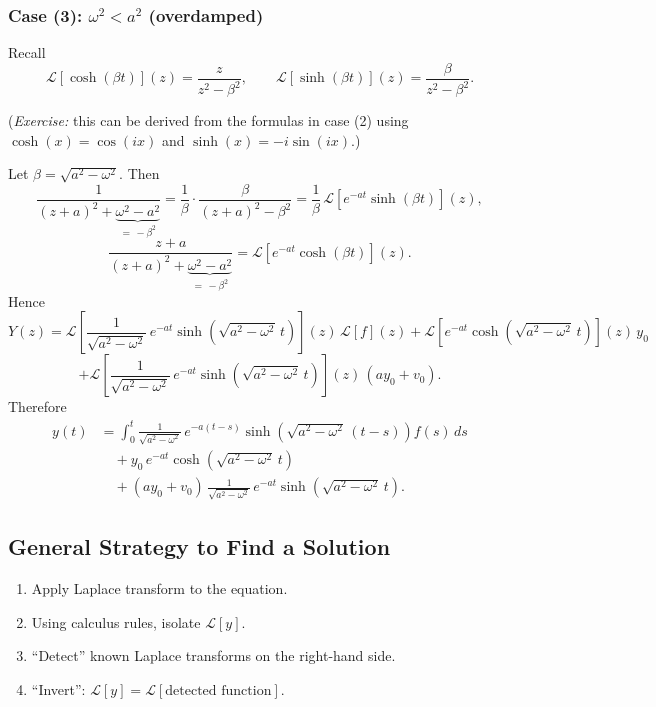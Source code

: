\subsubsection*{Case (3): $\omega^2 < a^2$ (overdamped)}

Recall
\[
\boxed{\mathcal{L}[\cosh(\beta t)](z) = \frac{z}{z^2 - \beta^2}, \qquad
\mathcal{L}[\sinh(\beta t)](z) = \frac{\beta}{z^2 - \beta^2}.}
\]

(\textit{Exercise:} this can be derived from the formulas in case (2) using $\cosh(x) = \cos(ix)$ and $\sinh(x) = -i\sin(ix)$.)

Let $\beta = \sqrt{a^2 - \omega^2}$. Then
\[
\frac{1}{(z+a)^2 + \underbrace{\omega^2 - a^2}_{=\,-\beta^2}}
= \frac{1}{\beta}\cdot\frac{\beta}{(z+a)^2 - \beta^2}
= \frac{1}{\beta}\,\mathcal{L}[e^{-at}\sinh(\beta t)](z),
\]
\[
\frac{z + a}{(z+a)^2 + \underbrace{\omega^2 - a^2}_{=\,-\beta^2}}
= \mathcal{L}[e^{-at}\cosh(\beta t)](z).
\]
Hence
\[
Y(z) = \mathcal{L}\!\left[\frac{1}{\sqrt{a^2 - \omega^2}}\,e^{-at}\sinh\!\left(\sqrt{a^2 - \omega^2}\,t\right)\right](z)\,\mathcal{L}[f](z)
+ \mathcal{L}[e^{-at}\cosh(\sqrt{a^2-\omega^2}\,t)](z)\,y_0
\]
\[
+ \mathcal{L}\!\left[\frac{1}{\sqrt{a^2 - \omega^2}}\,e^{-at}\sinh\!\left(\sqrt{a^2 - \omega^2}\,t\right)\right](z)\,(a y_0 + v_0).
\]
Therefore
\[
\boxed{
\begin{aligned}
y(t) &= \int_0^t \frac{1}{\sqrt{a^2 - \omega^2}}\,e^{-a(t-s)}\sinh\!\left(\sqrt{a^2 - \omega^2}\,(t - s)\right) f(s)\,ds \\
&\quad + y_0\,e^{-at}\cosh\!\left(\sqrt{a^2 - \omega^2}\,t\right) \\
&\quad + (a y_0 + v_0)\,\frac{1}{\sqrt{a^2 - \omega^2}}\,e^{-at}\sinh\!\left(\sqrt{a^2 - \omega^2}\,t\right).
\end{aligned}}
\]

\subsection{General Strategy to Find a Solution}

\begin{enumerate}
\item Apply Laplace transform to the equation.
\item Using calculus rules, isolate $\mathcal{L}[y]$.
\item ``Detect'' known Laplace transforms on the right-hand side.
\item ``Invert'': $\mathcal{L}[y] = \mathcal{L}[\text{detected function}]$.
\end{enumerate}
